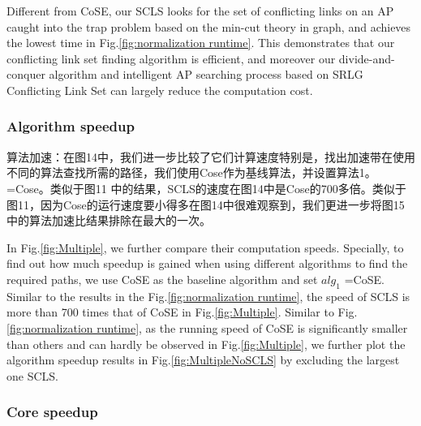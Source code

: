 Different from CoSE, our SCLS looks for the set of conflicting links on an AP caught into the trap problem based on the min-cut theory in graph, and achieves the lowest time in Fig.\ref{fig:normalization runtime}. This demonstrates that our conflicting link set finding algorithm is efficient, and moreover our divide-and-conquer algorithm and intelligent AP searching process based on SRLG Conflicting Link Set can largely reduce the computation cost.


\subsubsection{Algorithm speedup}
算法加速：在图14中，我们进一步比较了它们计算速度特别是，找出加速带在使用不同的算法查找所需的路径，我们使用Cose作为基线算法，并设置算法1。=Cose。类似于图11 中的结果，SCLS的速度在图14中是Cose的700多倍。类似于图11，因为Cose的运行速度要小得多在图14中很难观察到，我们更进一步将图15中的算法加速比结果排除在最大的一次。

In Fig.\ref{fig:Multiple}, we further compare their computation speeds. Specially, to find out how much speedup is gained when using different algorithms to find the required paths,
we use CoSE as the baseline algorithm and set $alg_1$ =CoSE. Similar to the results in the Fig.\ref{fig:normalization runtime}, the speed of SCLS is more than 700 times that of  CoSE in Fig.\ref{fig:Multiple}.  Similar to Fig.\ref{fig:normalization runtime}, as the running speed of CoSE is significantly smaller than others and can hardly be observed in Fig.\ref{fig:Multiple}, we further plot the algorithm speedup results in Fig.\ref{fig:MultipleNoSCLS} by excluding the largest one SCLS.



\subsubsection{Core speedup}

